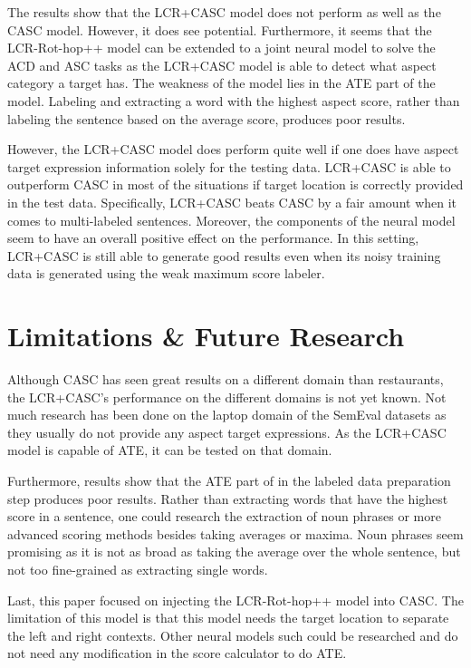 \documentclass[american, oneside]{ecsgdp}
\begin{document}
The results show that the LCR+CASC model does not perform as well as the CASC model. However, it does see potential. Furthermore, it seems that the LCR-Rot-hop++ model can be extended to a joint neural model to solve the ACD and ASC tasks as the LCR+CASC model is able to detect what aspect category a target has. The weakness of the model lies in the ATE part of the model. Labeling and extracting a word with the highest aspect score, rather than labeling the sentence based on the average score, produces poor results.

However, the LCR+CASC model does perform quite well if one does have aspect target expression information solely for the testing data. LCR+CASC is able to outperform CASC in most of the situations if target location is correctly provided in the test data. Specifically, LCR+CASC beats CASC by a fair amount when it comes to multi-labeled sentences. Moreover, the components of the neural model seem to have an overall positive effect on the performance. In this setting, LCR+CASC is still able to generate good results even when its noisy training data is generated using the weak maximum score labeler.

\section{Limitations \& Future Research} \label{sec:limitation}
Although CASC has seen great results on a different domain than restaurants, the LCR+CASC's performance on the different domains is not yet known. Not much research has been done on the laptop domain of the SemEval datasets as they usually do not provide any aspect target expressions. As the LCR+CASC model is capable of ATE, it can be tested on that domain. 

Furthermore, results show that the ATE part of in the labeled data preparation step produces poor results. Rather than extracting words that have the highest score in a sentence, one could research the extraction of noun phrases or more advanced scoring methods besides taking averages or maxima. Noun phrases seem promising as it is not as broad as taking the average over the whole sentence, but not too fine-grained as extracting single words.

Last, this paper focused on injecting the LCR-Rot-hop++ model into CASC. The limitation of this model is that this model needs the target location to separate the left and right contexts. Other neural models such could be researched and do not need any modification in the score calculator to do ATE.

\backmatter
\printbibliography
% 
% 

\appendix
\end{document}
